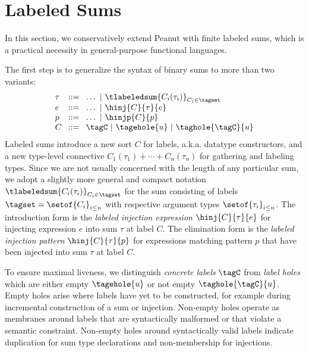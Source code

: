 \section{Labeled Sums}\label{sec:labeledsums}

In this section, we conservatively extend Peanut with finite labeled sums, which is a practical necessity in general-purpose functional languages.

The first step is to generalize the syntax of binary sums to more than two variants:
\[
  \arraycolsep=4pt\begin{array}{lll}
    \tau & ::= & \ldots ~\vert~ \tlabeledsum{C_i(\tau_i)}_{C_i \in \tagset} \\
    e    & ::= & \ldots ~\vert~ \hinj{C}{\tau}{e}                           \\
    p    & ::= & \ldots ~\vert~ \hinjp{C}{p}                                \\
    C    & ::= & \tagC ~\vert~ \tagehole{u} ~\vert~ \taghole{\tagC}{u}
  \end{array}
\]
Labeled sums introduce a new sort $C$ for labels, a.k.a. datatype constructors, and a new type-level connective $C_1(\tau_1) + \cdots + C_n(\tau_n)$ for gathering and labeling types.
Since we are not usually concerned with the length of any particular sum,
we adopt a slightly more general and compact notation $\tlabeledsum{C_i(\tau_i)}_{C_i \in \tagset}$
for the sum consisting of labels $\tagset = \setof{C_i}_{i \leq n}$ with respective argument types $\setof{\tau_i}_{i \leq n}$.
The introduction form is the \emph{labeled injection expression} $\hinj{C}{\tau}{e}$ for injecting expression $e$ into sum $\tau$ at label $C$.
The elimination form is the \emph{labeled injection pattern} $\hinj{C}{\tau}{p}$ 
for expressions matching pattern $p$ that have been injected into sum $\tau$ at label $C$.

To ensure maximal liveness, we distinguish \emph{concrete labels} $\tagC$
from \emph{label holes} which are either empty $\tagehole{u}$ or not empty $\taghole{\tagC}{u}$.
Empty holes arise where labels have yet to be constructed, for example during incremental construction of a sum or injection.
Non-empty holes operate as membranes around labels that are syntactically malformed or that violate a semantic constraint.
Non-empty holes around syntactically valid labels indicate duplication for sum type declarations and non-membership for injections.

